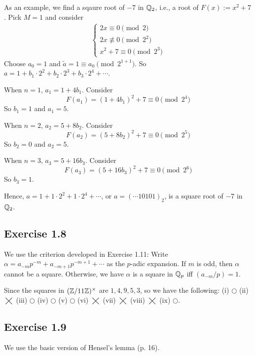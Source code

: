 \documentclass[../Koblitz.tex]{subfiles}
\begin{document}
As an example, we find a sqaure root of $-7$ in $\mathbb{Q}_2$, i.e., a root of $F(x):=x^2+7$. Pick $M=1$ and consider
\begin{align*}
    \begin{cases*}
        2x\equiv 0 \pmod{2} \\
        2x\not\equiv 0 \pmod{2^2} \\
        x^2+7\equiv 0 \pmod{2^3}
    \end{cases*}
\end{align*}
Choose $a_0=1$ and $\tilde{a}=1\equiv a_0 \pmod{2^{1+1}}$. So $a=1+b_1\cdot2^2+b_2\cdot2^3+b_3\cdot2^4+\cdots$.

When $n=1$, $a_1=1+4b_1$. Consider $$F(a_1)=(1+4b_1)^2+7\equiv 0\pmod{2^4}$$ So $b_1=1$ and $a_1=5$.

When $n=2$, $a_2=5+8b_2$. Consider $$F(a_2)=(5+8b_2)^2+7\equiv 0\pmod{2^5}$$ So $b_2=0$ and $a_2=5$.

When $n=3$, $a_3=5+16b_3$. Consider $$F(a_3)=(5+16b_3)^2+7\equiv 0\pmod{2^6}$$ So $b_3=1$.

Hence, $a=1+1\cdot2^2+1\cdot2^4+\cdots$, or $a=(\cdots10101)_2$, is a square root of $-7$ in $\mathbb{Q}_2$.

\subsection*{Exercise 1.8}

We use the criterion developed in Exercise 1.11: Write $\alpha=a_{-m}p^{-m}+a_{-m+1}p^{-m+1}+\cdots$ as the $p$-adic expansion. If $m$ is odd, then $\alpha$ cannot be a square. Otherwise, we have $\alpha$ is a square in $\mathbb{Q}_p$ iff $(a_{-m}/p)=1$.

Since the squares in $(\mathbb{Z}/11\mathbb{Z})^\times$ are $1,4,9,5,3$, so we have the following: (i) $\bigcirc$ (ii) $\bigtimes$ (iii) $\bigcirc$ (iv) $\bigcirc$ (v) $\bigcirc$ (vi) $\bigtimes$ (vii) $\bigtimes$ (viii) $\bigtimes$ (ix) $\bigcirc$.

\subsection*{Exercise 1.9}

We use the basic version of Hensel's lemma (p. 16).
\end{document}
